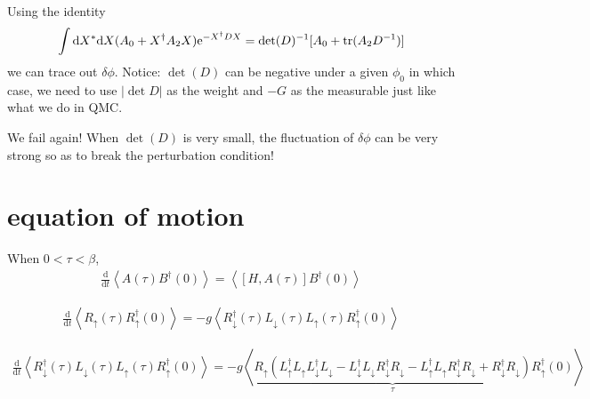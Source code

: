 \documentclass[12pt]{article}
\newcommand{\bea}{\begin{eqnarray}}
\newcommand{\eea}{\end{eqnarray}}
\newcommand{\md}{\mathrm{d}}
\newcommand{\ddt}{\frac{\md}{\md t}}
\newcommand{\me}{\mathrm{e}}
\begin{document}
Using the identity
\bea \int \md X^* \md X (A_0+X^\dag A_2 X)\me^{-X^\dag D X}=\det(D)^{-1}[A_0+{\rm tr}(A_2D^{-1})] \eea
we can trace out $\delta\phi$. {\color{red} Notice: $\det(D)$ can be negative under a given $\phi_0$ in which case, we need to use $|\det{D}|$ as the weight and $-G$ as the measurable just like what we do in QMC.}

We fail again! When $\det(D)$ is very small, the fluctuation of $\delta\phi$ can be very strong so as to break the perturbation condition!

\section{equation of motion}
When $0<\tau<\beta$,
\bea \ddt \left\langle A(\tau)B^\dag(0)\right\rangle=\left\langle [H,A(\tau)]B^\dag(0)\right\rangle \eea

\bea \ddt\left\langle R_\uparrow(\tau) R_\uparrow^\dag(0)\right\rangle = -g\left\langle R_\downarrow^\dag(\tau)L_\downarrow(\tau)L_\uparrow(\tau)R_\uparrow^\dag(0)\right\rangle \eea

\bea \ddt\left\langle R_\downarrow^\dag(\tau)L_\downarrow(\tau)L_\uparrow(\tau)R_\uparrow^\dag(0)\right\rangle = -g \left\langle \underbrace{R_\uparrow(L_\uparrow^\dag L_\uparrow L_\downarrow^\dag L_\downarrow - L_\downarrow^\dag L_\downarrow R_\downarrow^\dag R_\downarrow -L_\uparrow^\dag L_\uparrow R_\downarrow^\dag R_\downarrow +R_\downarrow^\dag R_\downarrow )}_{\tau} R_\uparrow^\dag(0)\right\rangle\eea


\end{document}
